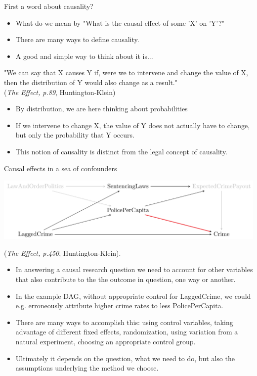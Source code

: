 \documentclass[notes,11pt, aspectratio=169]{beamer}
\begin{document}
\begin{frame}{First a word about causality?}
    \begin{itemize}
        \item What do we mean by "What is the causal effect of some 'X' on 'Y'?"
        \item There are many ways to define causality.
        \item A good and simple way to think about it is...
    \end{itemize}

    \begin{displayquote}
"We can say that X causes Y if, were we to intervene and change the value of X, then the distribution of Y would also change as a result."
\\
\flushright\tiny (\emph{The Effect, p.89}, Huntington-Klein)
\end{displayquote}
\normalsize
\begin{itemize}
        \item By distribution, we are here thinking about probabilities
        \item If we intervene to change X, the value of Y does not actually have to change, but only the probability that Y occurs. 
        \item This notion of causality is distinct from the legal concept of causality. 
    \end{itemize}
\end{frame}



\begin{frame}{Causal effects in a sea of confounders}
    \begin{center}
        \includegraphics[width=0.7\linewidth]{24_DiDLecture/24_DiDLecture_DAG.png}
    \end{center}
    \flushright
    \tiny{ (\emph{The Effect, p.450}, Huntington-Klein)}.
\normalsize
\flushleft
    \begin{itemize}
    \item In answering a causal research question we need to account for other variables that also contribute to the the outcome in question, one way or another. 
    \item In the example DAG, without appropriate control for LaggedCrime, we could e.g. erroneously attribute higher crime rates to less PolicePerCapita.    
    \item There are many ways to accomplish this: using control variables, taking advantage of different fixed effects, randomization, using variation from a natural experiment, choosing an appropriate control group.
    \item Ultimately it depends on the question, what we need to do, but also the assumptions underlying the method we choose.
    \end{itemize}
\end{frame}
\end{document}
